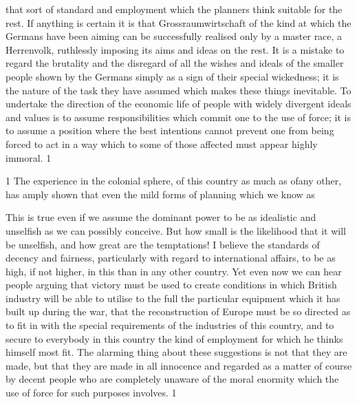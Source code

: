 \documentclass[11pt,openany]{book}
\begin{document}
that sort of standard and employment which the planners think suitable for the rest. If anything is certain it is that Grossraumwirtschaft of the kind at which the Germans have been aiming can be successfully realised only by a master race, a Herrenvolk, ruthlessly imposing its aims and ideas on the rest. It is a mistake to regard the brutality and the disregard of all the wishes and ideals of the smaller people shown by the Germans simply as a sign of their special wickedness; it is the nature of the task they have assumed which makes these things inevitable. To undertake the direction of the economic life of people with widely divergent ideals and values is to assume responsibilities which commit one to the use of force; it is to assume a position where the best intentions cannot prevent one from being forced to act in a way which to some of those affected must appear highly immoral. 1

1 The experience in the colonial sphere, of this country as much as ofany other, has amply shown that even the mild forms of planning which we know as

This is true even if we assume the dominant power to be as idealistic and unselfish as we can possibly conceive. But how small is the likelihood that it will be unselfish, and how great are the temptations! I believe the standards of decency and fairness, particularly with regard to international affairs, to be as high, if not higher, in this than in any other country. Yet even now we can hear people arguing that victory must be used to create conditions in which British industry will be able to utilise to the full the particular equipment which it has built up during the war, that the reconstruction of Europe must be so directed as to fit in with the special requirements of the industries of this country, and to secure to everybody in this country the kind of employment for which he thinks himself most fit. The alarming thing about these suggestions is not that they are made, but that they are made in all innocence and regarded as a matter of course by decent people who are completely unaware of the moral enormity which the use of force for such purposes involves. 1

\begin{center}\textasteriskcentered\hspace{0.9em}\textasteriskcentered\hspace{0.9em}\textasteriskcentered\end{center}

\begin{center}\textasteriskcentered\hspace{0.9em}\textasteriskcentered\hspace{0.9em}\textasteriskcentered\end{center}
\end{document}
